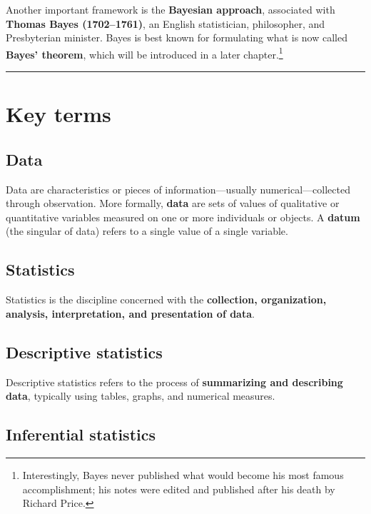 \documentclass[
  letterpaper,
  DIV=11,
  numbers=noendperiod]{scrreprt}
\begin{document}
Another important framework is the \textbf{Bayesian approach},
associated with \textbf{Thomas Bayes (1702--1761)}, an English
statistician, philosopher, and Presbyterian minister. Bayes is best
known for formulating what is now called \textbf{Bayes' theorem}, which
will be introduced in a later chapter.\footnote{Interestingly, Bayes
  never published what would become his most famous accomplishment; his
  notes were edited and published after his death by Richard Price.}

\begin{center}\rule{0.5\linewidth}{0.5pt}\end{center}

\section{Key terms}\label{key-terms}

\subsection{Data}\label{data}

Data are characteristics or pieces of information---usually
numerical---collected through observation. More formally, \textbf{data}
are sets of values of qualitative or quantitative variables measured on
one or more individuals or objects. A \textbf{datum} (the singular of
data) refers to a single value of a single variable.

\subsection{Statistics}\label{statistics}

Statistics is the discipline concerned with the \textbf{collection,
organization, analysis, interpretation, and presentation of data}.

\subsection{Descriptive statistics}\label{descriptive-statistics}

Descriptive statistics refers to the process of \textbf{summarizing and
describing data}, typically using tables, graphs, and numerical
measures.

\subsection{Inferential statistics}\label{inferential-statistics}
\end{document}
